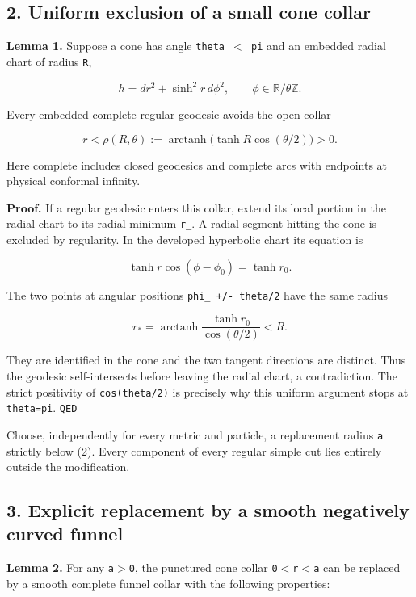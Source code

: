 \documentclass[11pt]{article}
\renewcommand{\textgreater}{\ensuremath{>}}
\renewcommand{\textless}{\ensuremath{<}}
\begin{document}
\subsection{2. Uniform exclusion of a small cone
collar}\label{uniform-exclusion-of-a-small-cone-collar}

\textbf{Lemma 1.} Suppose a cone has angle
\texttt{theta\ \textless{}\ pi} and an embedded radial chart of radius
\texttt{R},

\[
h=dr^2+\sinh^2r\,d\phi^2,
\qquad \phi\in\mathbb R/\theta\mathbb Z.
\]

Every embedded complete regular geodesic avoids the open collar

\[
r<\rho(R,\theta):=
\operatorname{arctanh}\big(\tanh R\cos(\theta/2)\big)>0.
\tag{2}
\]

Here complete includes closed geodesics and complete arcs with endpoints
at physical conformal infinity.

\textbf{Proof.} If a regular geodesic enters this collar, extend its
local portion in the radial chart to its radial minimum \texttt{r\_}. A
radial segment hitting the cone is excluded by regularity. In the
developed hyperbolic chart its equation is

\[
\tanh r\cos(\phi-\phi_0)=\tanh r_0.
\]

The two points at angular positions \texttt{phi\_\ +/-\ theta/2} have
the same radius

\[
r_* = \operatorname{arctanh}
       \frac{\tanh r_0}{\cos(\theta/2)}<R.
\]

They are identified in the cone and the two tangent directions are
distinct. Thus the geodesic self-intersects before leaving the radial
chart, a contradiction. The strict positivity of \texttt{cos(theta/2)}
is precisely why this uniform argument stops at \texttt{theta=pi}.
\texttt{QED}

Choose, independently for every metric and particle, a replacement
radius \texttt{a} strictly below (2). Every component of every regular
simple cut lies entirely outside the modification.

\subsection{3. Explicit replacement by a smooth negatively curved
funnel}\label{explicit-replacement-by-a-smooth-negatively-curved-funnel}

\textbf{Lemma 2.} For any \texttt{a\textgreater{}0}, the punctured cone
collar \texttt{0\textless{}r\textless{}a} can be replaced by a smooth
complete funnel collar with the following properties:
\end{document}
